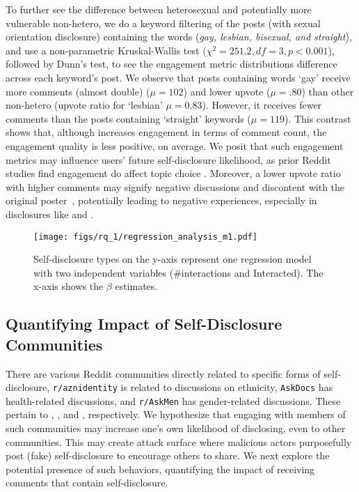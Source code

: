 To further see the difference between heterosexual and potentially more vulnerable non-hetero, we do a keyword filtering of the posts (with sexual orientation disclosure) containing the words (\textit{gay, lesbian, bisexual, and straight}), and use a non-parametric Kruskal-Wallis test ($\chi^2 = 251.2, df = 3, p < 0.001 $), followed by Dunn's test, to see the engagement metric distributions difference across each keyword's post. We observe that posts containing words `gay' receive more comments (almost double) ($\mu = 102$) and lower upvote ($\mu = .80$) than other non-hetero (\eg upvote ratio for `lesbian'  $\mu = 0.83$).
However, it receives fewer comments than the posts containing `straight' keywords ($\mu = 119$).
This contrast shows that, although \sexualOrientation increases engagement in terms of comment count, the engagement quality is less positive, on average. 
We posit that such engagement metrics may influence users' future self-disclosure likelihood, as prior Reddit studies find engagement do affect topic choice \cite{haq_short_2022}. Moreover, a lower upvote ratio with higher comments may signify negative discussions and discontent with the original poster~\cite{risch_top_2020}, potentially leading to negative experiences, especially in disclosures like \sexualOrientation and \ethnicity.




\begin{figure}[t]
    \centering
    \texttt{[image: figs/rq\_1/regression\_analysis\_m1.pdf]}
    \caption{%
    Self-disclosure types on the y-axis represent one regression model with two independent variables (\#interactions and Interacted). The x-axis shows the $\beta$ estimates.}
    \label{fig:regression_analysis_m1}
\end{figure}



\subsection{Quantifying Impact of Self-Disclosure Communities} \label{subsec:engagement_effect}


There are various Reddit communities directly related to specific forms of self-disclosure, \eg \texttt{r/aznidentity} is related to discussions on ethnicity, \texttt{AskDocs} has health-related discussions, and \texttt{r/AskMen} has gender-related discussions. 
These pertain to \ethnicity, \health, and \gender, respectively. We hypothesize that engaging with members of such communities may increase one's own likelihood of disclosing, even to other communities. This may create attack surface where malicious actors purposefully post (fake) self-disclosure to encourage others to share. We next explore the potential presence of such behaviors, quantifying the impact of receiving comments that contain self-disclosure.




